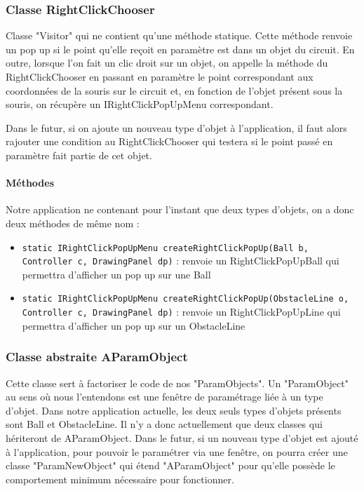 \documentclass{report}
\begin{document}
\subsubsection{Classe RightClickChooser}

Classe "Visitor" qui ne contient qu'une méthode statique. Cette méthode renvoie un pop up si le point qu'elle reçoit en paramètre est dans un objet du circuit. En outre, lorsque l'on fait un clic droit sur un objet, on appelle la méthode du RightClickChooser en passant en paramètre le point correspondant aux coordonnées de la souris sur le circuit et, en fonction de l'objet présent sous la souris, on récupère un IRightClickPopUpMenu correspondant.

Dans le futur, si on ajoute un nouveau type d'objet à l'application, il faut alors rajouter une condition au RightClickChooser qui testera si le point passé en paramètre fait partie de cet objet.

\paragraph*{Méthodes} Notre application ne contenant pour l'instant que deux types d'objets, on a donc deux méthodes de même nom :
\begin{itemize}
\item \texttt{static IRightClickPopUpMenu createRightClickPopUp(Ball b, Controller c, DrawingPanel dp)} : renvoie un RightClickPopUpBall qui permettra d'afficher un pop up sur une Ball
\item \texttt{static IRightClickPopUpMenu createRightClickPopUp(ObstacleLine o, Controller c, DrawingPanel dp)} : renvoie un RightClickPopUpLine qui permettra d'afficher un pop up sur un ObstacleLine
\end{itemize}

\subsubsection{Classe abstraite AParamObject}

Cette classe sert à factoriser le code de nos "ParamObjects". Un "ParamObject" au sens où nous l'entendons est une fenêtre de paramétrage liée à un type d'objet. Dans notre application actuelle, les deux seuls types d'objets présents sont Ball et ObstacleLine. Il n'y a donc actuellement que deux classes qui hériteront de AParamObject. Dans le futur, si un nouveau type d'objet est ajouté à l'application, pour pouvoir le paramétrer via une fenêtre, on pourra créer une classe "ParamNewObject" qui étend "AParamObject" pour qu'elle possède le comportement minimum nécessaire pour fonctionner.
\end{document}
